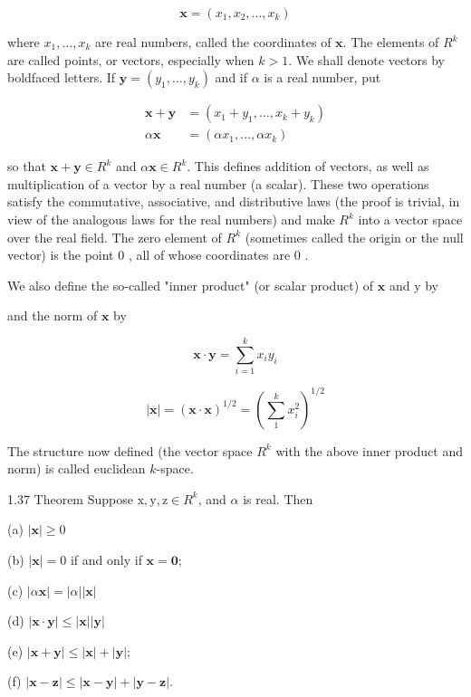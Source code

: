 \documentclass[10pt]{article}
\begin{document}
$$
\mathbf{x}=\left(x_{1}, x_{2}, \ldots, x_{k}\right)
$$

where $x_{1}, \ldots, x_{k}$ are real numbers, called the coordinates of $\mathbf{x}$. The elements of $R^{k}$ are called points, or vectors, especially when $k>1$. We shall denote vectors by boldfaced letters. If $\mathbf{y}=\left(y_{1}, \ldots, y_{k}\right)$ and if $\alpha$ is a real number, put

$$
\begin{aligned}
\mathbf{x}+\mathbf{y} & =\left(x_{1}+y_{1}, \ldots, x_{k}+y_{k}\right) \\
\alpha \mathbf{x} & =\left(\alpha x_{1}, \ldots, \alpha x_{k}\right)
\end{aligned}
$$

so that $\mathbf{x}+\mathbf{y} \in R^{k}$ and $\alpha \mathbf{x} \in R^{k}$. This defines addition of vectors, as well as multiplication of a vector by a real number (a scalar). These two operations satisfy the commutative, associative, and distributive laws (the proof is trivial, in view of the analogous laws for the real numbers) and make $R^{k}$ into a vector space over the real field. The zero element of $R^{k}$ (sometimes called the origin or the null vector) is the point 0 , all of whose coordinates are 0 .

We also define the so-called "inner product" (or scalar product) of $\mathbf{x}$ and y by

and the norm of $\mathbf{x}$ by

$$
\mathbf{x} \cdot \mathbf{y}=\sum_{i=1}^{k} x_{i} y_{i}
$$

$$
|\mathbf{x}|=(\mathbf{x} \cdot \mathbf{x})^{1 / 2}=\left(\sum_{1}^{k} x_{i}^{2}\right)^{1 / 2}
$$

The structure now defined (the vector space $R^{k}$ with the above inner product and norm) is called euclidean $k$-space.

1.37 Theorem Suppose $\mathrm{x}, \mathrm{y}, \mathrm{z} \in R^{k}$, and $\alpha$ is real. Then

(a) $|\mathbf{x}| \geq 0$

(b) $|\mathbf{x}|=0$ if and only if $\mathbf{x}=\mathbf{0}$;

(c) $|\alpha \mathbf{x}|=|\alpha||\mathbf{x}|$

(d) $|\mathbf{x} \cdot \mathbf{y}| \leq|\mathbf{x}||\mathbf{y}|$

(e) $|\mathbf{x}+\mathbf{y}| \leq|\mathbf{x}|+|\mathbf{y}|$;

(f) $|\mathbf{x}-\mathbf{z}| \leq|\mathbf{x}-\mathbf{y}|+|\mathbf{y}-\mathbf{z}|$.
\end{document}
